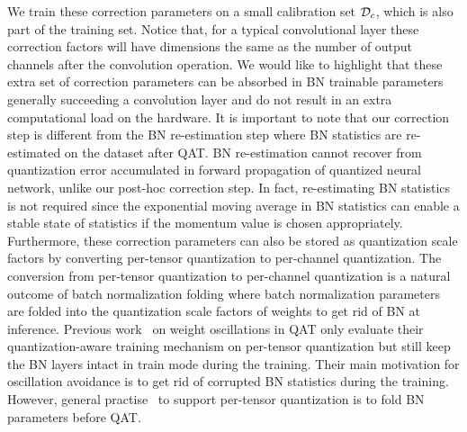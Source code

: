 We train these correction parameters on a small calibration set $\mathcal{D}_c$, which is also part of the training set. Notice that, for a typical convolutional layer these correction factors will have dimensions the same as the number of output channels after the convolution operation. We would like to highlight that these extra set of correction parameters can be absorbed in \acrfull{BN} trainable parameters generally succeeding a convolution layer and do not result in an extra computational load on the hardware. It is important to note that our correction step is different from the \acrshort{BN} re-estimation step \cite{nagel2022overcoming} where \acrshort{BN} statistics are re-estimated on the dataset after \acrshort{QAT}. \acrshort{BN} re-estimation cannot recover from quantization error accumulated in forward propagation of quantized neural network, unlike our post-hoc correction step. In fact, re-estimating \acrshort{BN} statistics is not required since the exponential moving average in \acrshort{BN} statistics can enable a stable state of statistics if the momentum value is chosen appropriately. Furthermore, these correction parameters can also be stored as quantization scale factors by converting per-tensor quantization to per-channel quantization. The conversion from per-tensor quantization to per-channel quantization is a natural outcome of batch normalization folding \cite{whitepaper} where batch normalization parameters are folded into the quantization scale factors of weights to get rid of \acrshort{BN} at inference. Previous work~\cite{nagel2022overcoming} on weight oscillations in \acrshort{QAT} only evaluate their quantization-aware training mechanism on per-tensor quantization but still keep the \acrshort{BN} layers intact in train mode during the training. Their main motivation for oscillation avoidance is to get rid of corrupted \acrshort{BN} statistics during the training. However, general practise~\cite{nagel2021white} to support per-tensor quantization is to fold \acrshort{BN} parameters before \acrshort{QAT}.   
 









